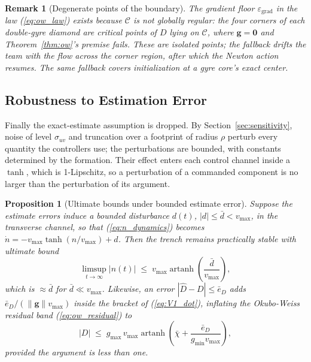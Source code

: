 \documentclass[12pt, letterpaper, oneside]{report}
\newtheorem{proposition}[theorem]{Proposition}
\newtheorem{remark}[theorem]{Remark}
\begin{document}
\begin{remark}[Degenerate points of the boundary]
\label{rem:ow_corners}
The gradient floor $\varepsilon_{\text{grad}}$ in the law
(\ref{eq:ow_law}) exists because $\mathcal{C}$ is not globally regular:
the four corners of each double-gyre diamond are critical points of $D$
lying on $\mathcal{C}$, where $\mathbf{g} = \mathbf{0}$ and
Theorem~\ref{thm:ow}'s premise fails. These are isolated points; the
fallback drifts the team with the flow across the corner region, after
which the Newton action resumes. The same fallback covers
initialization at a gyre core's exact center.
\end{remark}

\subsection{Robustness to Estimation Error}
\label{sec:stab_iss}

Finally the exact-estimate assumption is dropped. By
Section~\ref{sec:sensitivity}, noise of level $\sigma_{uv}$ and
truncation over a footprint of radius $\rho$ perturb every quantity the
controllers use; the perturbations are bounded, with constants
determined by the formation. Their effect enters each control channel
inside a $\tanh$, which is 1-Lipschitz, so a perturbation of a
commanded component is no larger than the perturbation of its argument.

\begin{proposition}[Ultimate bounds under bounded estimate error]
\label{prop:iss}
Suppose the estimate errors induce a bounded disturbance $d(t)$, $|d|
\leq \bar{d} < v_{\max}$, in the transverse channel, so that
(\ref{eq:n_dynamics}) becomes $\dot{n} = -v_{\max}\tanh(n/v_{\max}) +
d$. Then the trench remains practically stable with ultimate bound
\begin{equation}
    \limsup_{t\to\infty} |n(t)| \;\leq\;
    v_{\max}\operatorname{artanh}\!\left(\frac{\bar{d}}{v_{\max}}\right),
    \label{eq:iss_bound}
\end{equation}
which is $\approx \bar{d}$ for $\bar{d} \ll v_{\max}$. Likewise, an
error $|\hat{D} - D| \leq \bar{e}_D$ adds $\bar{e}_D/(\|\mathbf{g}\|
v_{\max})$ inside the bracket of (\ref{eq:V1_dot}), inflating the
Okubo-Weiss residual band (\ref{eq:ow_residual}) to
\begin{equation}
    |D| \;\leq\; g_{\max}\,v_{\max}
    \operatorname{artanh}\!\left(\bar{\chi} +
    \frac{\bar{e}_D}{g_{\min} v_{\max}}\right),
    \label{eq:ow_residual_noisy}
\end{equation}
provided the argument is less than one.
\end{proposition}
\end{document}
